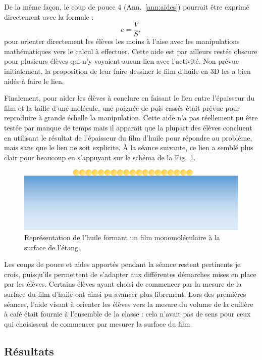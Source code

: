 \documentclass[12pt,a4paper, fleqn]{report}
\begin{document}
De la même façon, le coup de pouce 4 (Ann.~\ref{ann:aides}) pourrait être exprimé directement avec la formule :
\[e = \frac{V}{S}, \]
pour orienter directement les élèves les moins à l'aise avec les manipulations mathématiques vers le calcul à effectuer.
Cette aide est par ailleurs restée obscure pour plusieurs élèves qui n'y voyaient aucun lien avec l'activité.
Non prévue initialement, la proposition de leur faire dessiner le film d'huile en 3D les a bien aidés à faire le lien.

Finalement, pour aider les élèves à conclure en faisant le lien entre l'épaisseur du film et la taille d'une molécule, une poignée de pois cassés était prévue pour reproduire à grande échelle la manipulation.
Cette aide n'a pas réellement pu être testée par manque de temps mais il apparait que la plupart des élèves concluent en utilisant le résultat de l'épaisseur du film d'huile pour répondre au problème, mais sans que le lien ne soit explicite.
À la séance suivante, ce lien a semblé plus clair pour beaucoup en s'appuyant sur le schéma de la Fig.~\ref{fig:exp}.

\begin{figure}[htbp]
\center
\includegraphics[scale=.25]{experience.png}
\caption{Représentation de l'huile formant un film monomoléculaire à la surface de l'étang.}
\label{fig:exp}
\end{figure}

Les coups de pouce et aides apportés pendant la séance restent pertinents je crois, puisqu'ils permettent de s'adapter aux différentes démarches mises en place par les élèves.
Certains élèves ayant choisi de commencer par la mesure de la surface du film d'huile ont ainsi pu avancer plus librement.
Lors des premières séances, l'aide visant à orienter les élèves vers la mesure du volume de la cuillère à café était fournie à l'ensemble de la classe : cela n'avait pas de sens pour ceux qui choisissent de commencer par mesurer la surface du film.

\subsection{Résultats}
\end{document}
